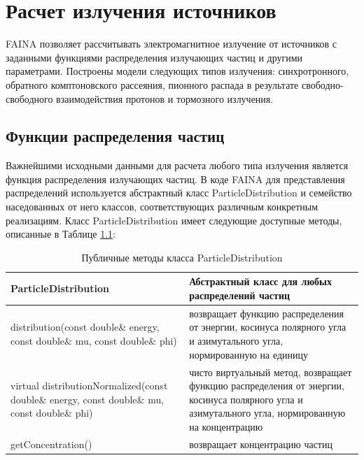 \chapter{Расчет излучения источников}\label{radiation}
FAINA позволяет рассчитывать электромагнитное излучение от источников с заданными функциями распределения излучающих частиц и другими параметрами. Построены модели следующих типов излучения: синхротронного, обратного комптоновского рассеяния, пионного распада в результате свободно-свободного взаимодействия протонов и тормозного излучения.

\section{Функции распределения частиц}

Важнейшими исходными данными для расчета любого типа излучения является функция распределения излучающих частиц. В коде FAINA для представления распределений используется абстрактный класс ParticleDistribution и семейство наседованных от него классов, соответствующих различным конкретным реализациям. Класс ParticleDistribution имеет следующие доступные методы, описанные в Таблице \ref{ParticleDistribution}:

	\begin{table}
	\begin{center}
		\caption{Публичные методы класса ParticleDistribution }
		\label{ParticleDistribution}
		\begin{small}
		\begin{tabularx}{\textwidth}{|X|X|}
			\hline
			\textbf{ParticleDistribution} & Абстрактный класс для любых распределений частиц\\
			\hline
			distribution(const double\& energy, const double\& mu, const double\& phi) & возвращает функцию распределения от энергии, косинуса полярного угла и азимутального угла, нормированную на единицу \\
			\hline
			virtual distributionNormalized(const double\& energy, const double\& mu, const double\& phi) & чисто виртуальный метод, возвращает функцию распределения от энергии, косинуса полярного угла и азимутального угла, нормированную на концентрацию \\
			\hline
			getConcentration() & возвращает концентрацию частиц\\
			\hline
		\end{tabularx}
	    \end{small}
	\end{center}
\end{table}

